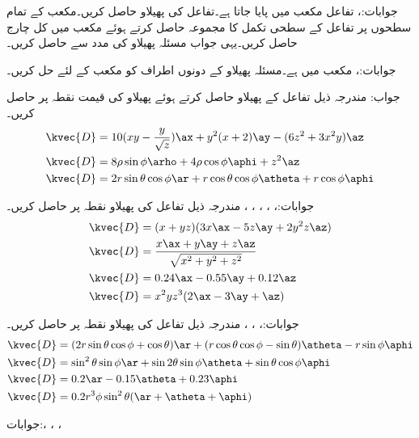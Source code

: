 جوابات:، 
تفاعل  مکعب  میں پایا جاتا ہے۔تفاعل کی پھیلاو  حاصل کریں۔مکعب کے تمام سطحوں پر تفاعل کے سطحی تکمل کا مجموعہ حاصل کرتے ہوئے مکعب میں کل چارج حاصل کریں۔یہی جواب مسئلہ پھیلاو  کی مدد سے حاصل کریں۔

جوابات:، 
مکعب  میں  ہے۔مسئلہ پھیلاو کے دونوں اطراف کو مکعب کے لئے حل کریں۔

جواب:
مندرجہ ذیل تفاعل کے پھیلاو حاصل کرتے ہوئے پھیلاو کی قیمت نقطہ  پر حاصل کریں۔
\begin{align*}
\kvec{D}&=10(xy-\frac{y}{\sqrt{z}})\ax+y^2(x+2)\ay-(6z^2+3x^2y)\az\\
\kvec{D}&=8\rho \sin \phi \arho+4\rho \cos \phi \aphi+z^2\az\\
\kvec{D}&=2 r \sin \theta \cos \phi\ar +r \cos \theta \cos \phi \atheta+r \cos \phi \aphi
\end{align*}

جوابات:، ، ، ، ، 
مندرجہ ذیل تفاعل کی پھیلاو نقطہ  پر حاصل کریں۔
\begin{align*}
\kvec{D}&=(x+yz)(3x\ax-5z\ay+2y^2z\az)\\
\kvec{D}&=\frac{x\ax+y\ay+z\az}{\sqrt{x^2+y^2+z^2}}\\
\kvec{D}&=0.24\ax-0.55\ay+0.12\az\\
\kvec{D}&=x^2yz^3(2\ax-3\ay+\az)
\end{align*}

جوابات:، ، ، 
مندرجہ ذیل تفاعل کی پھیلاو نقطہ  پر حاصل کریں۔
\begin{align*}
\kvec{D}&=(2r\sin\theta\cos\phi+\cos\theta)\ar+(r\cos\theta\cos\phi-\sin\theta)\atheta-r\sin\phi\aphi\\
\kvec{D}&=\sin^2\theta\sin\phi\ar+\sin 2\theta \sin \phi\atheta+\sin\theta\cos\phi\aphi\\
\kvec{D}&=0.2\ar-0.15\atheta+0.23\aphi\\
\kvec{D}&=0.2r^3 \phi \sin^2 \theta (\ar+\atheta+\aphi)
\end{align*}

جوابات:، ، ، 

